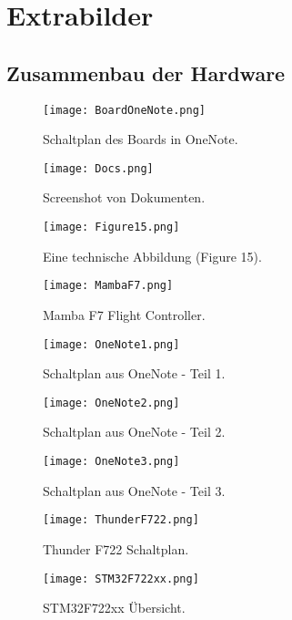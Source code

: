 \chapter{Extrabilder}
\section{Zusammenbau der Hardware}\label{sec:BildliHardware}

\begin{figure}[h!]
	\centering
	\texttt{[image: BoardOneNote.png]}
	\caption{Schaltplan des Boards in OneNote.}
	\label{fig:boardonenote}
\end{figure}

\begin{figure}[h!]
	\centering
	\texttt{[image: Docs.png]}
	\caption{Screenshot von Dokumenten.}
	\label{fig:docs}
\end{figure}

\begin{figure}[h!]
	\centering
	\texttt{[image: Figure15.png]}
	\caption{Eine technische Abbildung (Figure 15).}
	\label{fig:figure15}
\end{figure}

\begin{figure}[h!]
	\centering
	\texttt{[image: MambaF7.png]}
	\caption{Mamba F7 Flight Controller.}
	\label{fig:mambaf7}
\end{figure}

\begin{figure}[h!]
	\centering
	\texttt{[image: OneNote1.png]}
	\caption{Schaltplan aus OneNote - Teil 1.}
	\label{fig:onenote1}
\end{figure}

\begin{figure}[h!]
	\centering
	\texttt{[image: OneNote2.png]}
	\caption{Schaltplan aus OneNote - Teil 2.}
	\label{fig:onenote2}
\end{figure}

\begin{figure}[h!]
	\centering
	\texttt{[image: OneNote3.png]}
	\caption{Schaltplan aus OneNote - Teil 3.}
	\label{fig:onenote3}
\end{figure}

\begin{figure}[h!]
	\centering
	\texttt{[image: ThunderF722.png]}
	\caption{Thunder F722 Schaltplan.}
	\label{fig:thunderf722}
\end{figure}

\begin{figure}[h!]
	\centering
	\texttt{[image: STM32F722xx.png]}
	\caption{STM32F722xx Übersicht.}
	\label{fig:stm32f722xx}
\end{figure}
